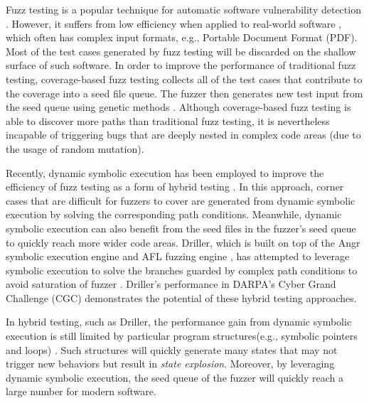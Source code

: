 

Fuzz testing is a popular technique for automatic software vulnerability detection 
 \cite{Miller:Fuzz, 5010257, sutton2007fuzzing}.
 However, it suffers from low efficiency when applied to real-world software 
 \cite{neystadt2008automated, godefroid2008automating, ganesh2009taint, cadar2011symbolic, rawat2017vuzzer, stephens2016driller},
  which often has complex input formats, e.g., Portable Document Format (PDF).
  Most of the test cases generated by fuzz testing will be discarded on the shallow surface of such software.
  In order to improve the performance of traditional fuzz testing, 
  coverage-based fuzz testing collects all of the test cases that contribute to the coverage into a seed file queue.
  The fuzzer then generates new test input from the seed queue using genetic methods
  \cite{rawat2017vuzzer, online:afl, stephens2016driller}.
  Although coverage-based fuzz testing is able to discover more paths than traditional fuzz testing, 
  it is nevertheless incapable of triggering bugs that are deeply nested in complex code areas (due to the usage of random mutation).

Recently, dynamic symbolic execution has been employed to improve the efficiency of fuzz testing as a form of hybrid testing \cite{godefroid2012sage, yeh2015craxfuzz, majumdar2007hybrid, pak2012hybrid}.
 In this approach, corner cases that are difficult for fuzzers to cover are generated from dynamic symbolic execution by solving the corresponding path conditions.
 Meanwhile, dynamic symbolic execution can also benefit from the seed files in the fuzzer's seed queue to quickly reach more wider code areas. 
 Driller, which is built on top of the Angr symbolic execution engine \cite{Shoshitaishvili_firmalice-automatic} and AFL fuzzing engine \cite{online:afl}, 
 has attempted to leverage symbolic execution to solve the branches guarded 
 by complex path conditions to avoid saturation of fuzzer \cite{stephens2016driller}. 
 Driller's performance in DARPA's Cyber Grand Challenge (CGC) \cite{online:CGC} demonstrates the potential of these hybrid testing approaches.


In hybrid testing, such as Driller, the performance gain from dynamic symbolic execution is still limited 
 by particular program structures(e.g., symbolic pointers and loops) \cite{schwartz2010all, Boonstoppel:RAP, cadar2011symbolic, baldoni2016survey}. 
 Such structures will quickly generate many states that may not trigger new behaviors
 but result in \textit{state explosion}.
 Moreover, by leveraging dynamic symbolic execution, 
 the seed queue of the fuzzer will quickly reach a large number for modern software. 

